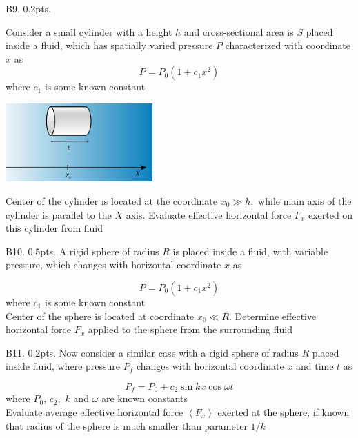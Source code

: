 \begin{subpr}{B9. \hfill 0.2pts.}

Consider a small cylinder with a height ${h}$ and cross-sectional area is ${S}$ placed inside a fluid, which has spatially varied pressure ${P}$ characterized with coordinate ${x}$ as
	$$P = P_0(1+c_1x^2)$$
where ${c_1}$ is some known constant
\begin{center}
\includegraphics[height=3cm]{Images/17_bbl_prob_cylinder_cx21.PNG}
\end{center}
Center of the cylinder is located at the coordinate ${x_0\gg h},$ while main axis of the cylinder is parallel to the ${X}$ axis. Evaluate effective horizontal force ${F_x}$ exerted on this cylinder from fluid 
\end{subpr}

\begin{subpr}{B10. \hfill 0.5pts.} 
A rigid sphere of radius ${R}$ is placed inside a fluid, with variable pressure, which changes with horizontal coordinate ${x}$ as

$$P = P_0(1+c_1x^2)$$
where ${c_1}$ is some known constant\\
Center of the sphere is located at coordinate ${x_0\ll R}$. Determine effective horizontal force ${F_x}$ applied to the sphere from the surrounding fluid 
\end{subpr}

\begin{subpr}{B11. \hfill 0.2pts.}
Now consider a similar case with a rigid sphere of radius ${R}$ placed inside fluid, where pressure ${P_f}$ changes with horizontal coordinate ${x}$ and time ${t}$ as

$$P_f = P_0 + c_2\sin kx\cos\omega t$$
where ${P_0}$, ${c_2},$ ${k}$ and ${\omega}$ are known constants\\
Evaluate average effective horizontal force ${\left<F_x\right>}$ exerted at the sphere, if known that radius of the sphere is much smaller than parameter ${1/k}$
\end{subpr}

